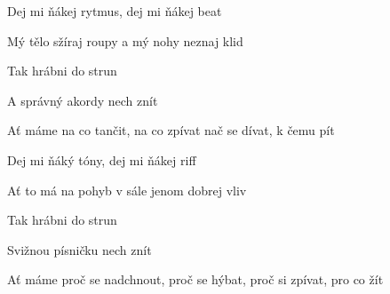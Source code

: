 

\zs
Dej mi ňákej rytmus, dej mi ňákej beat

Mý tělo sžíraj roupy a mý nohy neznaj klid

Tak hrábni do strun

A správný akordy nech znít

Ať máme na co tančit, na co zpívat nač se dívat, k čemu pít
\ks

\zs
Dej mi ňáký tóny, dej mi ňákej riff

Ať to má na pohyb v sále jenom dobrej vliv

Tak hrábni do strun

Svižnou písničku nech znít

Ať máme proč se nadchnout, proč se hýbat, proč si zpívat, pro co žít
\ks

\kp